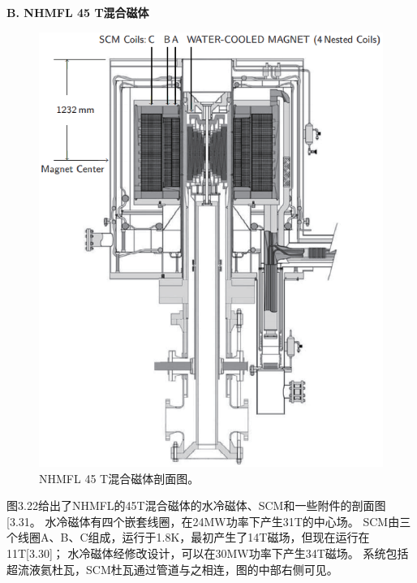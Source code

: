 \textbf{B. NHMFL 45 T混合磁体}
\begin{figure}[htbp]
	\centering
	\includegraphics[scale=0.9]{chpt3/figs/fig3.22.eps}
	\caption{NHMFL 45 T混合磁体剖面图。}
\end{figure}

图3.22给出了NHMFL的45T混合磁体的水冷磁体、SCM和一些附件的剖面图[3.31。
水冷磁体有四个嵌套线圈，在24MW功率下产生31T的中心场。
SCM由三个线圈A、B、C组成，运行于1.8K，最初产生了14T磁场，但现在运行在11T[3.30]；
水冷磁体经修改设计，可以在30MW功率下产生34T磁场。
系统包括超流液氦杜瓦，SCM杜瓦通过管道与之相连，图的中部右侧可见。

